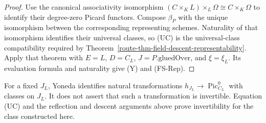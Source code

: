 \begin{proof}
  Use the canonical associativity isomorphism
  \((C\times_K L)\times_L\Omega\cong C\times_K\Omega\) to
  identify their degree-zero Picard functors. Compose \(\beta_P\)
  with the unique isomorphism between the corresponding representing
  schemes. Naturality of that isomorphism identifies their universal
  classes, so (UC) is the universal-class compatibility required by
  Theorem~\ref{route-thm-field-descent-representability}. Apply that
  theorem with \(E=L\), \(D=C_L\), \(J=P.\mathrm{gluedOver}\),
  and \(\xi=\xi_L\). Its evaluation formula and naturality give
  (Y) and (FS-Rep).
\end{proof}

\begin{remark}
  \label{route-rem-first-frontier}

  For a fixed \(J_L\), Yoneda identifies natural transformations
  \(h_{J_L}\to\operatorname{Pic}^0_{C_L}\) with classes on \(J_L\).
  It does not assert that such a transformation is invertible.  Equation
  (UC) and the reflection and descent arguments above prove invertibility
  for the class constructed here.
\end{remark}
